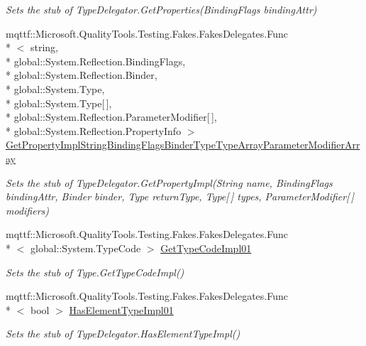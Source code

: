 \begin{DoxyCompactItemize}
\begin{DoxyCompactList}\small\item\em Sets the stub of Type\-Delegator.\-Get\-Properties(\-Binding\-Flags binding\-Attr)\end{DoxyCompactList}\item 
mqttf\-::\-Microsoft.\-Quality\-Tools.\-Testing.\-Fakes.\-Fakes\-Delegates.\-Func\\*
$<$ string, \\*
global\-::\-System.\-Reflection.\-Binding\-Flags, \\*
global\-::\-System.\-Reflection.\-Binder, \\*
global\-::\-System.\-Type, \\*
global\-::\-System.\-Type\mbox{[}$\,$\mbox{]}, \\*
global\-::\-System.\-Reflection.\-Parameter\-Modifier\mbox{[}$\,$\mbox{]}, \\*
global\-::\-System.\-Reflection.\-Property\-Info $>$ \hyperlink{class_system_1_1_reflection_1_1_fakes_1_1_stub_type_delegator_a0897abb41dbfd9f5666346f0ac47cda4}{Get\-Property\-Impl\-String\-Binding\-Flags\-Binder\-Type\-Type\-Array\-Parameter\-Modifier\-Array}
\begin{DoxyCompactList}\small\item\em Sets the stub of Type\-Delegator.\-Get\-Property\-Impl(\-String name, Binding\-Flags binding\-Attr, Binder binder, Type return\-Type, Type\mbox{[}$\,$\mbox{]} types, Parameter\-Modifier\mbox{[}$\,$\mbox{]} modifiers)\end{DoxyCompactList}\item 
mqttf\-::\-Microsoft.\-Quality\-Tools.\-Testing.\-Fakes.\-Fakes\-Delegates.\-Func\\*
$<$ global\-::\-System.\-Type\-Code $>$ \hyperlink{class_system_1_1_reflection_1_1_fakes_1_1_stub_type_delegator_a598fd94b97a7398cffc5bb476cbb7b9f}{Get\-Type\-Code\-Impl01}
\begin{DoxyCompactList}\small\item\em Sets the stub of Type.\-Get\-Type\-Code\-Impl()\end{DoxyCompactList}\item 
mqttf\-::\-Microsoft.\-Quality\-Tools.\-Testing.\-Fakes.\-Fakes\-Delegates.\-Func\\*
$<$ bool $>$ \hyperlink{class_system_1_1_reflection_1_1_fakes_1_1_stub_type_delegator_a3d89bfa495fdd2219412f4ce8c0e78c3}{Has\-Element\-Type\-Impl01}
\begin{DoxyCompactList}\small\item\em Sets the stub of Type\-Delegator.\-Has\-Element\-Type\-Impl()\end{DoxyCompactList}\item 

\end{DoxyCompactItemize}
